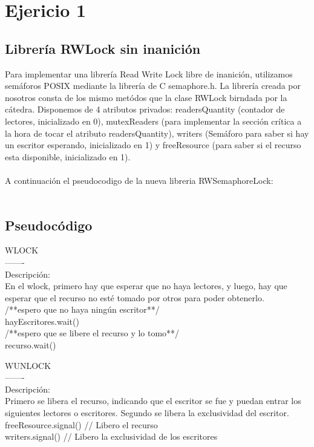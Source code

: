 \section{Ejericio 1}
\subsection{Librería RWLock sin inanición}
Para implementar una librer\'ia Read Write Lock libre de inanici\'on, utilizamos semáforos POSIX mediante la librería de C semaphore.h. La librería creada por nosotros consta de los mismo metódos que la clase RWLock birndada por la cátedra. Disponemos de 4 atributos privados: readersQuantity (contador de lectores, inicializado en 0), mutexReaders (para implementar la sección crítica a la hora de tocar el atributo readersQuantity), writers (Semáforo para saber si hay un escritor esperando, inicializado en 1) y freeResource (para saber si el recurso esta disponible, inicializado en 1).\\
\\
A continuación el pseudocodigo de la nueva libreria RWSemaphoreLock:\\
\\
\subsection{Pseudoc\'odigo}

\begin{codebox}
WLOCK\\
-------\\
Descripción:\\
En el wlock, primero hay que esperar que no haya lectores, y luego, hay que esperar que el recurso no esté tomado por otros para poder obtenerlo.\\

/**espero que no haya ningún escritor**/ \\
hayEscritores.wait() \\
/**espero que se libere el recurso y lo tomo**/ \\
recurso.wait() \\
\end{codebox}
WUNLOCK\\
-------		\\		
Descripción:\\
Primero se libera el recurso, indicando que el escritor se fue y puedan entrar los siguientes lectores o escritores.
Segundo se libera la exclusividad del escritor. \\
	freeResource.signal()		// Libero el recurso	\\
	writers.signal()		// Libero la exclusividad de los escritores\\

